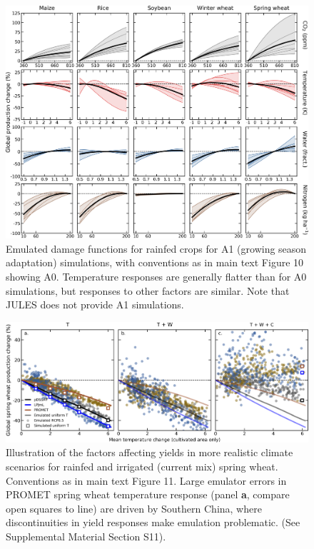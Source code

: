\documentclass[12pt]{article}
\begin{document}
\begin{figure}[h!]
  \centering
  \includegraphics[width = 16.3cm]{em_CTWN_all_crops_A1.png}
  \caption{
  Emulated damage functions for rainfed crops for A1 (growing season adaptation) simulations, with conventions as in main text Figure 10 showing A0.  Temperature responses are generally flatter than for A0 simulations, but responses to other factors are similar.  Note that JULES does not provide A1 simulations. 
  }
  \label{fig:all_dims}
\end{figure}

\clearpage

\begin{figure}[h!]
  \centering
  \includegraphics[width = 16.3cm]{LPJmL_pDSSAT_PROMET_RCP85_all_cases_spring_wheat.png}
  \caption{
	  Illustration of the factors affecting yields in more realistic climate scenarios for rainfed and irrigated (current mix) spring wheat. Conventions as in  main text Figure 11. Large emulator errors in PROMET spring wheat temperature response (panel \textbf{a}, compare open squares to line) are driven by Southern China, where discontinuities in yield responses make emulation problematic. (See Supplemental Material Section S11).
	  }
\end{figure}
\end{document}
